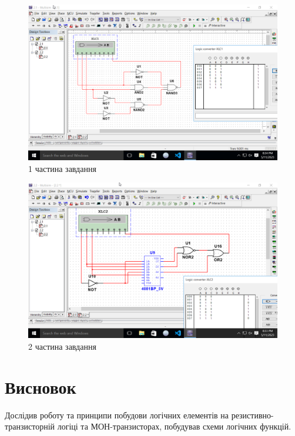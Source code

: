 \documentclass[a4paper, 12pt, oneside]{extarticle}
\begin{document}
\begin{figure}[h]
	\includegraphics[width=\textwidth]{2.1}
	\caption{1 частина завдання}
\end{figure}
\begin{figure}[h]
	\includegraphics[width=\textwidth]{2.2}
	\caption{2 частина завдання}
\end{figure}

\clearpage

\section*{Висновок}

Дослідив роботу та принципи побудови логічних елементів на резистивно-транзисторній логіці та МОН-транзисторах,
побудував схеми логічних функцій.
\end{document}
